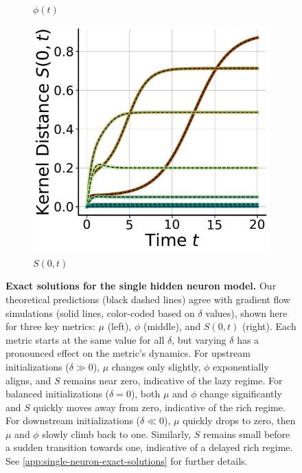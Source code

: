 \documentclass{article}
\theoremstyle{plain}
\theoremstyle{definition}
\theoremstyle{remark}
\begin{document}
\begin{figure}
\begin{subfigure}{0.325\linewidth}
        \caption{$\phi(t)$}
    \end{subfigure}
    \begin{subfigure}{0.325\linewidth}
        \centering
        \includegraphics[width=\linewidth]{fig/single-neuron/kernel-distance.pdf}
        \caption{$S(0,t)$}
    \end{subfigure}
    \caption{
    \textbf{Exact solutions for the single hidden neuron model.}
    Our theoretical predictions (black dashed lines) agree with gradient flow simulations (solid lines, color-coded based on $\delta$ values), shown here for three key metrics: $\mu$ (left), $\phi$ (middle), and $S(0,t)$ (right).
    Each metric starts at the same value for all $\delta$, but varying $\delta$ has a pronounced effect on the metric's dynamics.
    For upstream initializations ($\delta \gg 0$), $\mu$ changes only slightly, $\phi$ exponentially aligns, and $S$ remains near zero, indicative of the lazy regime.
    For balanced initializations ($\delta = 0$), both $\mu$ and $\phi$ change significantly and $S$ quickly moves away from zero, indicative of the rich regime.
    For downstream initializations ($\delta \ll 0$), $\mu$ quickly drops to zero, then $\mu$ and $\phi$ slowly climb back to one. 
    Similarly, $S$ remains small before a sudden transition towards one, indicative of a delayed rich regime.
     See \cref{app:single-neuron-exact-solutions} for further details.
    }
    \vspace{-18pt}
    \label{fig:single-neuron-exact-dynamics}
\end{figure}
\end{document}
